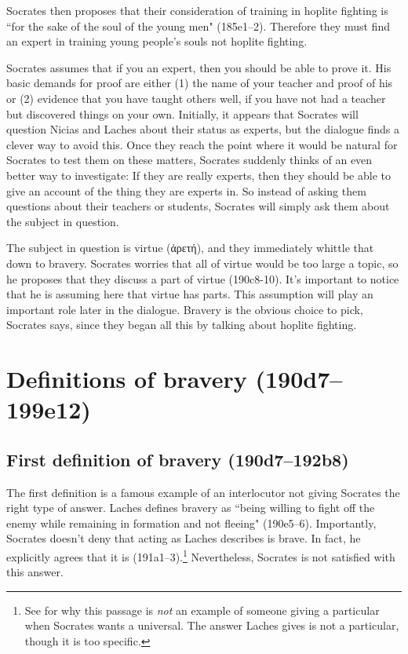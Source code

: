 \documentclass[11pt]{article}
\begin{document}
Socrates then proposes that their consideration of training in hoplite fighting is ``for the sake of the soul of the young men" (185e1--2).  Therefore they must find an expert in training young people's souls not hoplite fighting.

Socrates assumes that if you an expert, then you should be able to prove it.  His basic demands for proof are either (1) the name of your teacher and proof of his  or (2) evidence that you have taught others well, if you have not had a teacher but discovered things on your own.  Initially, it appears that Socrates will question Nicias and Laches about their status as experts, but the dialogue finds a clever way to avoid this.  Once they reach the point where it would be natural for Socrates to test them on these matters, Socrates suddenly thinks of an even better way to investigate: If they are really experts, then they should be able to give an account of the thing they are experts in.  So instead of asking them questions about their teachers or students, Socrates will simply ask them about the subject in question.

The subject in question is virtue (ἀρετή), and they immediately whittle that down to bravery.  Socrates worries that all of virtue would be too large a topic, so he proposes that they discuss a part of virtue (190c8-10).  It's important to notice that he is assuming here that virtue has parts.  This assumption will play an important role later in the dialogue.  Bravery is the obvious choice to pick, Socrates says, since they began all this by talking about hoplite fighting.


\section{Definitions of bravery (190d7--199e12)}

\subsection{First definition of bravery (190d7--192b8)}

The first definition is a famous example of an interlocutor not giving Socrates the right type of answer.  Laches defines bravery as ``being willing to fight off the enemy while remaining in formation and not fleeing" (190e5--6).   Importantly, Socrates doesn't deny that acting as Laches describes is brave.  In fact, he explicitly agrees that it is (191a1--3).\footnote{See \citet{nehamas1975} for why this passage is \emph{not} an example of someone giving a particular when Socrates wants a universal.  The answer Laches gives is not a particular, though it is too specific.}  Nevertheless, Socrates is not satisfied with this answer.
\end{document}

